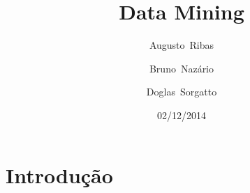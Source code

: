 \documentclass[a4paper,10pt]{article}
\title{Data Mining}
\author{\mbox{Augusto Ribas} \and \mbox{Bruno Nazário} \and \mbox{Doglas Sorgatto}}
\date{02/12/2014}
\begin{document}
\titlepage

\tableofcontents

\section{Introdução}
\end{document}
